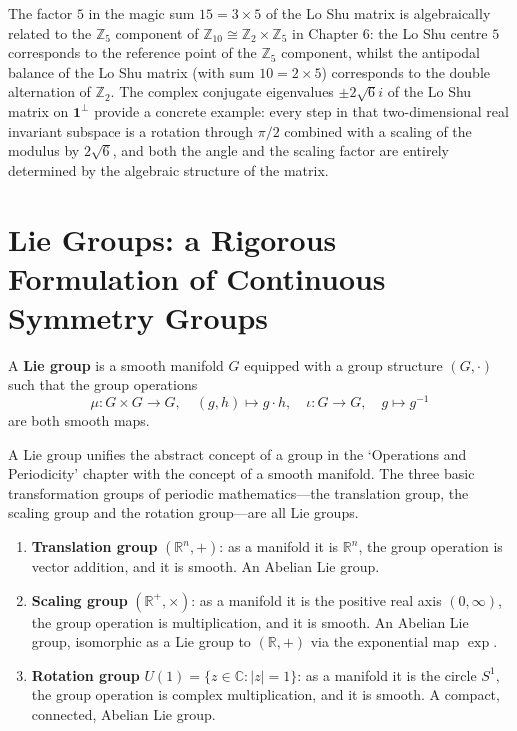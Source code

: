 \begin{remark}\label{rem:luoshu_hetu_interface}
The factor $5$ in the magic sum $15 = 3 \times 5$ of the Lo Shu matrix is algebraically related to the $\mathbb{Z}_5$ component of $\mathbb{Z}_{10} \cong \mathbb{Z}_2 \times \mathbb{Z}_5$ in Chapter 6: the Lo Shu centre $5$ corresponds to the reference point of the $\mathbb{Z}_5$ component, whilst the antipodal balance of the Lo Shu matrix (with sum $10 = 2 \times 5$) corresponds to the double alternation of $\mathbb{Z}_2$. The complex conjugate eigenvalues $\pm 2\sqrt{6}i$ of the Lo Shu matrix on $\mathbf{1}^\perp$ provide a concrete example: every step in that two-dimensional real invariant subspace is a rotation through $\pi/2$ combined with a scaling of the modulus by $2\sqrt{6}$, and both the angle and the scaling factor are entirely determined by the algebraic structure of the matrix.
\end{remark}


\section{\texorpdfstring{Lie Groups: a Rigorous Formulation of Continuous Symmetry Groups}{Lie Groups}}

\begin{definition}\label{def:lie_group}
A \textbf{Lie group} is a smooth manifold $G$ equipped with a group structure $(G, \cdot)$ such that the group operations
\[
\mu: G \times G \to G, \quad (g, h) \mapsto g \cdot h, \quad
\iota: G \to G, \quad g \mapsto g^{-1}
\]
are both smooth maps.

A Lie group unifies the abstract concept of a group in the `Operations and Periodicity' chapter with the concept of a smooth manifold. The three basic transformation groups of periodic mathematics---the translation group, the scaling group and the rotation group---are all Lie groups.
\end{definition}

\begin{example}\label{ex:three_lie_groups}
\begin{enumerate}[label=(\roman*)]
    \item \textbf{Translation group} $(\mathbb{R}^n, +)$: as a manifold it is $\mathbb{R}^n$, the group operation is vector addition, and it is smooth. An Abelian Lie group.
    \item \textbf{Scaling group} $(\mathbb{R}^+, \times)$: as a manifold it is the positive real axis $(0, \infty)$, the group operation is multiplication, and it is smooth. An Abelian Lie group, isomorphic as a Lie group to $(\mathbb{R}, +)$ via the exponential map $\exp$.
    \item \textbf{Rotation group} $U(1) = \{z \in \mathbb{C} : |z| = 1\}$: as a manifold it is the circle $S^1$, the group operation is complex multiplication, and it is smooth. A compact, connected, Abelian Lie group.
\end{enumerate}
\end{example}

